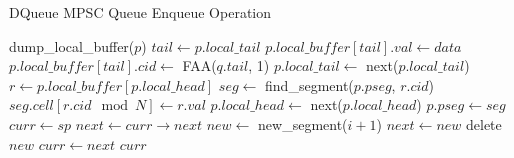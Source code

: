 \begin{algorithm}[!ht]
    \centering
    \captionsetup{justification=centering}
    \caption{DQueue \ac{MPSC} Queue Enqueue Operation \cite{WangCacheCoherent}}
    \label{alg:dqueue-enqueue}
    \scriptsize
    \begin{algorithmic}[1]
                \State dump\_local\_buffer($p$) 
            \EndIf
            \State $tail \gets p.local\_tail$
            \State $p.local\_buffer[tail].val \gets data$
            \State $p.local\_buffer[tail].cid \gets$ FAA($q.tail$, 1) 
            \State $p.local\_tail \gets$ next($p.local\_tail$)
        \EndFunction
        \State
                \State $r \gets p.local\_buffer[p.local\_head]$
                \State $seg \gets$ find\_segment($p.pseg$, $r.cid$)
                \State $seg.cell[r.cid \mod N] \gets r.val$ 
                \State $p.local\_head \gets$ next($p.local\_head$)
                    \State $p.pseg \gets seg$ 
                \EndIf
            \EndWhile
        \EndFunction
        \State
            \State $curr \gets sp$
                \State $next \gets curr\rightarrow next$
                    \State $new \gets$ new\_segment($i + 1$)
                        \State $next \gets new$
                    \Else
                        \State delete $new$ 
                    \EndIf
                \EndIf
                \State $curr \gets next$
            \EndFor
            \State \Return $curr$
        \EndFunction
    \end{algorithmic}
\end{algorithm}

